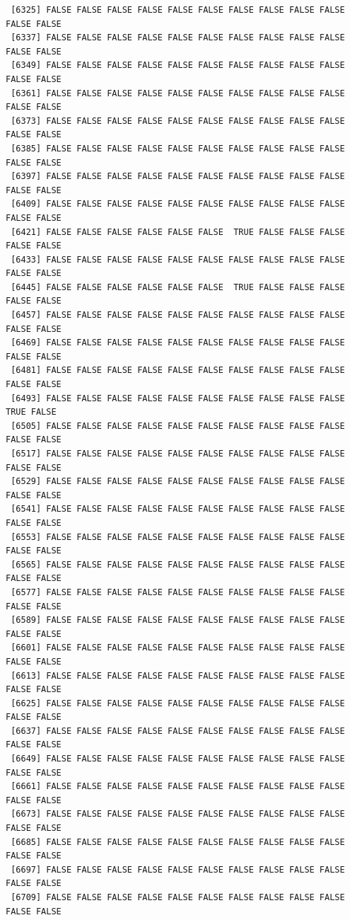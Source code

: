 \documentclass[
  a4paper,
  DIV=11,
  numbers=noendperiod]{scrartcl}
\begin{document}
\begin{verbatim}
 [6325] FALSE FALSE FALSE FALSE FALSE FALSE FALSE FALSE FALSE FALSE FALSE FALSE
 [6337] FALSE FALSE FALSE FALSE FALSE FALSE FALSE FALSE FALSE FALSE FALSE FALSE
 [6349] FALSE FALSE FALSE FALSE FALSE FALSE FALSE FALSE FALSE FALSE FALSE FALSE
 [6361] FALSE FALSE FALSE FALSE FALSE FALSE FALSE FALSE FALSE FALSE FALSE FALSE
 [6373] FALSE FALSE FALSE FALSE FALSE FALSE FALSE FALSE FALSE FALSE FALSE FALSE
 [6385] FALSE FALSE FALSE FALSE FALSE FALSE FALSE FALSE FALSE FALSE FALSE FALSE
 [6397] FALSE FALSE FALSE FALSE FALSE FALSE FALSE FALSE FALSE FALSE FALSE FALSE
 [6409] FALSE FALSE FALSE FALSE FALSE FALSE FALSE FALSE FALSE FALSE FALSE FALSE
 [6421] FALSE FALSE FALSE FALSE FALSE FALSE  TRUE FALSE FALSE FALSE FALSE FALSE
 [6433] FALSE FALSE FALSE FALSE FALSE FALSE FALSE FALSE FALSE FALSE FALSE FALSE
 [6445] FALSE FALSE FALSE FALSE FALSE FALSE  TRUE FALSE FALSE FALSE FALSE FALSE
 [6457] FALSE FALSE FALSE FALSE FALSE FALSE FALSE FALSE FALSE FALSE FALSE FALSE
 [6469] FALSE FALSE FALSE FALSE FALSE FALSE FALSE FALSE FALSE FALSE FALSE FALSE
 [6481] FALSE FALSE FALSE FALSE FALSE FALSE FALSE FALSE FALSE FALSE FALSE FALSE
 [6493] FALSE FALSE FALSE FALSE FALSE FALSE FALSE FALSE FALSE FALSE  TRUE FALSE
 [6505] FALSE FALSE FALSE FALSE FALSE FALSE FALSE FALSE FALSE FALSE FALSE FALSE
 [6517] FALSE FALSE FALSE FALSE FALSE FALSE FALSE FALSE FALSE FALSE FALSE FALSE
 [6529] FALSE FALSE FALSE FALSE FALSE FALSE FALSE FALSE FALSE FALSE FALSE FALSE
 [6541] FALSE FALSE FALSE FALSE FALSE FALSE FALSE FALSE FALSE FALSE FALSE FALSE
 [6553] FALSE FALSE FALSE FALSE FALSE FALSE FALSE FALSE FALSE FALSE FALSE FALSE
 [6565] FALSE FALSE FALSE FALSE FALSE FALSE FALSE FALSE FALSE FALSE FALSE FALSE
 [6577] FALSE FALSE FALSE FALSE FALSE FALSE FALSE FALSE FALSE FALSE FALSE FALSE
 [6589] FALSE FALSE FALSE FALSE FALSE FALSE FALSE FALSE FALSE FALSE FALSE FALSE
 [6601] FALSE FALSE FALSE FALSE FALSE FALSE FALSE FALSE FALSE FALSE FALSE FALSE
 [6613] FALSE FALSE FALSE FALSE FALSE FALSE FALSE FALSE FALSE FALSE FALSE FALSE
 [6625] FALSE FALSE FALSE FALSE FALSE FALSE FALSE FALSE FALSE FALSE FALSE FALSE
 [6637] FALSE FALSE FALSE FALSE FALSE FALSE FALSE FALSE FALSE FALSE FALSE FALSE
 [6649] FALSE FALSE FALSE FALSE FALSE FALSE FALSE FALSE FALSE FALSE FALSE FALSE
 [6661] FALSE FALSE FALSE FALSE FALSE FALSE FALSE FALSE FALSE FALSE FALSE FALSE
 [6673] FALSE FALSE FALSE FALSE FALSE FALSE FALSE FALSE FALSE FALSE FALSE FALSE
 [6685] FALSE FALSE FALSE FALSE FALSE FALSE FALSE FALSE FALSE FALSE FALSE FALSE
 [6697] FALSE FALSE FALSE FALSE FALSE FALSE FALSE FALSE FALSE FALSE FALSE FALSE
 [6709] FALSE FALSE FALSE FALSE FALSE FALSE FALSE FALSE FALSE FALSE FALSE FALSE

\end{verbatim}
\end{document}
